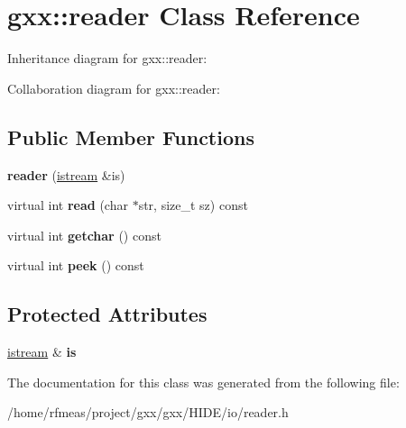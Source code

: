 \hypertarget{classgxx_1_1reader}{}\section{gxx\+:\+:reader Class Reference}
\label{classgxx_1_1reader}


Inheritance diagram for gxx\+:\+:reader\+:


Collaboration diagram for gxx\+:\+:reader\+:
\subsection*{Public Member Functions}
\begin{DoxyCompactItemize}
\item 
{\bfseries reader} (\hyperlink{classgxx_1_1istream}{istream} \&is)\hypertarget{classgxx_1_1reader_a647e2a0c38ee22246926eb58f6a450fe}{}\label{classgxx_1_1reader_a647e2a0c38ee22246926eb58f6a450fe}

\item 
virtual int {\bfseries read} (char $\ast$str, size\+\_\+t sz) const \hypertarget{classgxx_1_1reader_ab274bcc71b9354d47c03268e87fed272}{}\label{classgxx_1_1reader_ab274bcc71b9354d47c03268e87fed272}

\item 
virtual int {\bfseries getchar} () const \hypertarget{classgxx_1_1reader_a2802ff2c649dca7a1e3b202964e5da1f}{}\label{classgxx_1_1reader_a2802ff2c649dca7a1e3b202964e5da1f}

\item 
virtual int {\bfseries peek} () const \hypertarget{classgxx_1_1reader_a3d181a7f0bcf3bd62df604af6e077078}{}\label{classgxx_1_1reader_a3d181a7f0bcf3bd62df604af6e077078}

\end{DoxyCompactItemize}
\subsection*{Protected Attributes}
\begin{DoxyCompactItemize}
\item 
\hyperlink{classgxx_1_1istream}{istream} \& {\bfseries is}\hypertarget{classgxx_1_1reader_adcfa52d9652509183665ed69cbf83d18}{}\label{classgxx_1_1reader_adcfa52d9652509183665ed69cbf83d18}

\end{DoxyCompactItemize}


The documentation for this class was generated from the following file\+:\begin{DoxyCompactItemize}
\item 
/home/rfmeas/project/gxx/gxx/\+H\+I\+D\+E/io/reader.\+h\end{DoxyCompactItemize}

